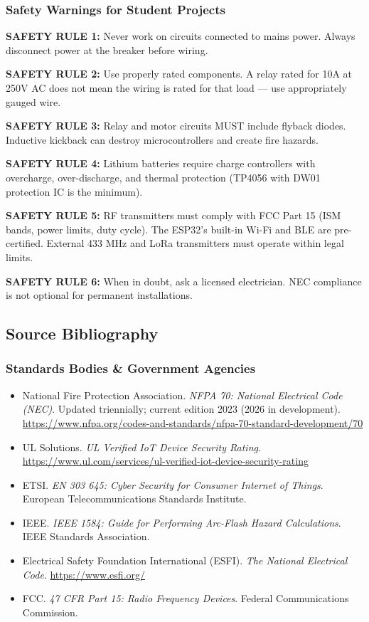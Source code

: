 \documentclass[11pt,letterpaper]{article}
\begin{document}
\subsubsection{Safety Warnings for Student Projects}

\begin{quotebox}
\textbf{SAFETY RULE 1:} Never work on circuits connected to mains power. Always disconnect power at the breaker before wiring.

\textbf{SAFETY RULE 2:} Use properly rated components. A relay rated for 10A at 250V AC does not mean the wiring is rated for that load --- use appropriately gauged wire.

\textbf{SAFETY RULE 3:} Relay and motor circuits MUST include flyback diodes. Inductive kickback can destroy microcontrollers and create fire hazards.

\textbf{SAFETY RULE 4:} Lithium batteries require charge controllers with overcharge, over-discharge, and thermal protection (TP4056 with DW01 protection IC is the minimum).

\textbf{SAFETY RULE 5:} RF transmitters must comply with FCC Part 15 (ISM bands, power limits, duty cycle). The ESP32's built-in Wi-Fi and BLE are pre-certified. External 433 MHz and LoRa transmitters must operate within legal limits.

\textbf{SAFETY RULE 6:} When in doubt, ask a licensed electrician. NEC compliance is not optional for permanent installations.
\end{quotebox}

\subsection{Source Bibliography}

\subsubsection{Standards Bodies \& Government Agencies}
\begin{itemize}[leftmargin=2em]
  \item National Fire Protection Association. \textit{NFPA 70: National Electrical Code (NEC)}. Updated triennially; current edition 2023 (2026 in development). \url{https://www.nfpa.org/codes-and-standards/nfpa-70-standard-development/70}
  \item UL Solutions. \textit{UL Verified IoT Device Security Rating}. \url{https://www.ul.com/services/ul-verified-iot-device-security-rating}
  \item ETSI. \textit{EN 303 645: Cyber Security for Consumer Internet of Things}. European Telecommunications Standards Institute.
  \item IEEE. \textit{IEEE 1584: Guide for Performing Arc-Flash Hazard Calculations}. IEEE Standards Association.
  \item Electrical Safety Foundation International (ESFI). \textit{The National Electrical Code}. \url{https://www.esfi.org/}
  \item FCC. \textit{47 CFR Part 15: Radio Frequency Devices}. Federal Communications Commission.
\end{itemize}
\end{document}
